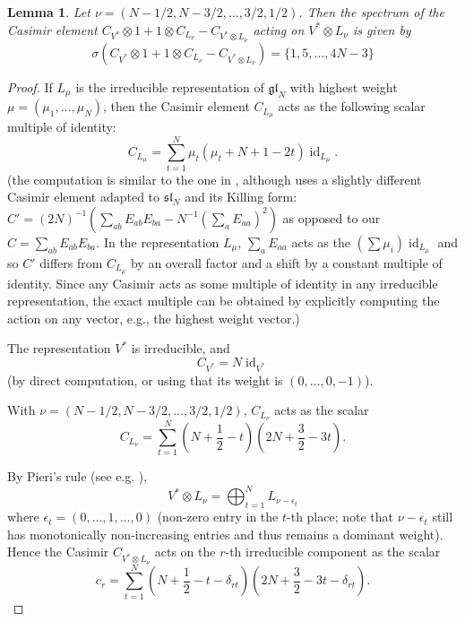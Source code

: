 \documentclass[11pt]{article}
\newtheorem{lemma}{Lemma}
\begin{document}
\begin{lemma} \label{lemma:casimirSpectrum}
    Let $\nu =  (N-1/2,N-3/2,\dots,3/2,1/2)$. Then the spectrum of the Casimir element $C_{V^*}\otimes 1 + 1\otimes C_{L_\nu} - C_{V^*\otimes L_\nu } $ acting on $V^*\otimes L_\nu$ is given by $$
    \sigma(C_{V^*}\otimes 1 + 1\otimes C_{L_\nu} - C_{V^*\otimes L_\nu })= \{1,5,\dots,4N-3\}
    $$
\end{lemma}
\begin{proof}
If $L_\mu$ is the irreducible representation of $\mathfrak{gl}_N$ with highest weight $\mu=(\mu_1,\dots,\mu_N)$, then the Casimir element $C_{L_\mu}$ acts as the following scalar multiple of identity:
$$
C_{L_\mu} = \sum_{t=1}^N \mu_t (\mu_t + N+1-2t) \operatorname{id}_{L_\mu}.
$$ (the computation is similar to the one in  \cite[\S3.3.2, Lemma 3.3.8]{GoodmanWallach}, although \cite{GoodmanWallach} uses a slightly different Casimir element adapted to $\mathfrak{sl}_N$ and its Killing form: $C'=(2N)^{-1}(\sum_{ab} E_{ab}E_{ba} - N^{-1}(\sum_{a}E_{aa})^2)$ as opposed to our $C=\sum_{ab} E_{ab}E_{ba}$. In the representation $L_\mu$, $\sum_{a} E_{aa}$ acts as the $(\sum \mu_i )\operatorname{id}_{L_\mu}$  and so $C'$ differs from $C_{L_\mu}$  by an overall factor and a shift by a constant multiple of identity. Since any Casimir acts as some multiple of identity in any irreducible representation, the exact multiple can be obtained by explicitly computing the action on any vector, e.g., the highest weight vector.)

The representation $V^*$ is irreducible, and $$C_{V^*}=N \operatorname{id}_{V^*}$$ (by direct computation, or using that its weight is $(0,\dots,0,-1)$). 

With $\nu =  (N-1/2,N-3/2,\dots,3/2,1/2)$, $C_{L_\nu}$ acts as the scalar $$
C_{L_\nu} = \sum_{t=1}^N (N+\frac{1}{2}-t)(2N+\frac{3}{2}-3t ).$$

By Pieri's rule (see e.g. \cite[\S9.2, Corollary 9.2.4]{GoodmanWallach}), $$V^*\otimes L_\nu = \bigoplus_{t=1}^{N} L_{\nu-\epsilon_t}$$ where $\epsilon_t = (0,\dots,1,\dots,0)$ (non-zero entry in the $t$-th place; note that $\nu-\epsilon_t$ still has monotonically non-increasing entries and thus remains a dominant weight). Hence the Casimir $C_{V^*\otimes L_\nu}$ acts on the $r$-th irreducible component as the scalar \[ c_r = 
\sum_{t=1}^N (N+\frac{1}{2} -t -\delta_{rt})(2N+\frac{3}{2}-3t -\delta_{rt}).\]



\end{proof}
\end{document}
